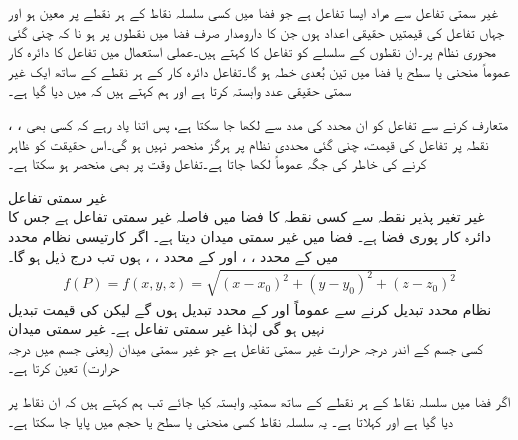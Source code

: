 
غیر سمتی تفاعل سے مراد ایسا تفاعل ہے جو فضا میں کسی سلسلہ نقاط کے ہر نقطے  پر معین ہو اور جہاں تفاعل کی قیمتیں حقیقی اعداد ہوں جن کا دارومدار صرف فضا میں نقطوں پر ہو نا کہ چنی گئی محوری نظام پر۔ان نقطوں کے سلسلے کو تفاعل کا  کہتے ہیں۔عملی استعمال میں تفاعل  کا دائرہ کار  عموماً  منحنی یا سطح یا فضا میں تین بُعدی خطہ ہو گا۔تفاعل  دائرہ کار  کے ہر نقطے کے ساتھ ایک غیر سمتی حقیقی عدد وابستہ کرتا ہے اور ہم کہتے ہیں کہ  میں  دیا گیا ہے۔

، ،  متعارف کرنے سے تفاعل  کو ان محدد کی مدد سے  لکھا جا سکتا ہے، پس اتنا یاد رہے کہ کسی بھی نقطہ  پر  تفاعل  کی قیمت، چنی گئی محددی نظام پر ہرگز منحصر نہیں ہو گی۔اس حقیقت کو ظاہر کرنے کی خاطر  کی جگہ عموماً  لکھا جاتا ہے۔تفاعل  وقت پر بھی منحصر ہو سکتا ہے۔

\quad غیر سمتی تفاعل\\
غیر تغیر پذیر نقطہ  سے  کسی نقطہ  کا فضا میں فاصلہ غیر سمتی تفاعل ہے جس کا دائرہ کار  پوری فضا ہے۔   فضا میں غیر سمتی میدان دیتا ہے۔ اگر کارتیسی نظام محدد میں  کے محدد ، ،  اور  کے محدد ، ،  ہوں تب  درج ذیل ہو گا۔
\begin{align*}
f(P)=f(x,y,z)=\sqrt{(x-x_0)^2+(y-y_0)^2+(z-z_0)^2}
\end{align*}
نظام محدد تبدیل کرنے سے عموماً  اور  کے محدد تبدیل ہوں گے لیکن  کی قیمت تبدیل نہیں ہو گی لہٰذا  غیر سمتی تفاعل ہے۔ 
\quad غیر سمتی میدان\\
کسی جسم کے اندر درجہ حرارت  غیر سمتی تفاعل ہے جو غیر سمتی میدان (یعنی جسم میں درجہ حرارت)  تعین کرتا ہے۔

اگر فضا میں  سلسلہ نقاط کے ہر نقطے  کے ساتھ سمتیہ  وابستہ کیا جائے تب ہم کہتے ہیں کہ ان نقاط پر  دیا گیا ہے اور   کہلاتا ہے۔  یہ سلسلہ نقاط کسی منحنی یا سطح یا حجم میں پایا جا سکتا ہے۔

